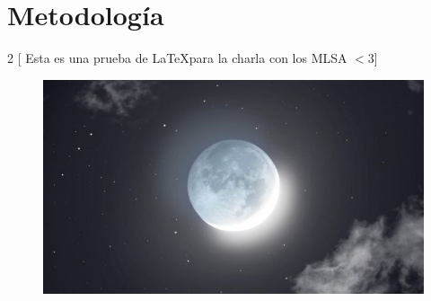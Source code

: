 \section{Metodología}
\begin{multicols}{2}
    [ Esta es una prueba de \LaTeX para la charla con los MLSA $<3$]
    \blindtext
\end{multicols}
\lipsum[1]
\begin{figure}
    \includegraphics[width=\linewidth]{build/img/luna.jpg}
\end{figure}



